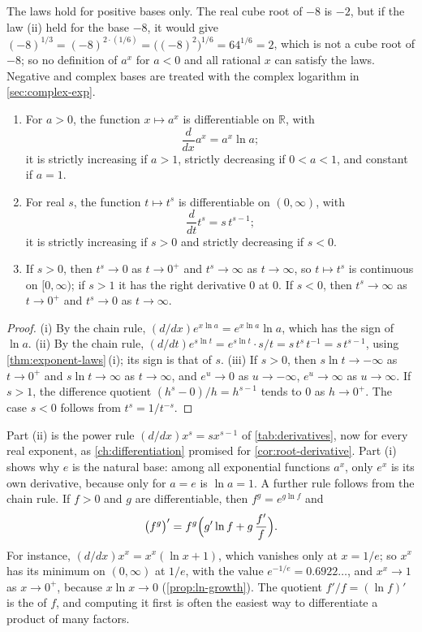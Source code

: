 The laws hold for positive bases only. The real cube root of $-8$ is $-2$, but if the law (ii) held for the base $-8$, it would give $(-8)^{1/3}=(-8)^{2\cdot(1/6)}=\bigl((-8)^2\bigr)^{1/6}=64^{1/6}=2$, which is not a cube root of $-8$; so no definition of $a^x$ for $a<0$ and all rational $x$ can satisfy the laws. Negative and complex bases are treated with the complex logarithm in \cref{sec:complex-exp}.

\begin{theorem}
\label{thm:power-derivatives}
\leavevmode
\begin{enumerate}
\item For $a>0$, the function $x\mapsto a^x$ is differentiable on $\mathbb R$, with
\[
\frac d{dx}a^x=a^x\ln a ;
\]
it is strictly increasing if $a>1$, strictly decreasing if $0<a<1$, and constant if $a=1$.
\item For real $s$, the function $t\mapsto t^s$ is differentiable on $(0,\infty)$, with
\[
\frac d{dt}t^s=s\,t^{s-1} ;
\]
it is strictly increasing if $s>0$ and strictly decreasing if $s<0$.
\item If $s>0$, then $t^s\to0$ as $t\to0^+$ and $t^s\to\infty$ as $t\to\infty$, so $t\mapsto t^s$ is continuous on $[0,\infty)$; if $s>1$ it has the right derivative $0$ at $0$. If $s<0$, then $t^s\to\infty$ as $t\to0^+$ and $t^s\to0$ as $t\to\infty$.
\end{enumerate}
\end{theorem}

\begin{proof}
(i) By the chain rule, $(d/dx)e^{x\ln a}=e^{x\ln a}\ln a$, which has the sign of $\ln a$. (ii) By the chain rule, $(d/dt)e^{s\ln t}=e^{s\ln t}\cdot s/t=s\,t^s\,t^{-1}=s\,t^{s-1}$, using \cref{thm:exponent-laws}\,(i); its sign is that of $s$. (iii) If $s>0$, then $s\ln t\to-\infty$ as $t\to0^+$ and $s\ln t\to\infty$ as $t\to\infty$, and $e^u\to0$ as $u\to-\infty$, $e^u\to\infty$ as $u\to\infty$. If $s>1$, the difference quotient $(h^s-0)/h=h^{s-1}$ tends to $0$ as $h\to0^+$. The case $s<0$ follows from $t^s=1/t^{-s}$.
\end{proof}

Part (ii) is the power rule $(d/dx)x^s=sx^{s-1}$ of \cref{tab:derivatives}, now for every real exponent, as \cref{ch:differentiation} promised for \cref{cor:root-derivative}. Part (i) shows why $e$ is the natural base: among all exponential functions $a^x$, only $e^x$ is its own derivative, because only for $a=e$ is $\ln a=1$. A further rule follows from the chain rule. If $f>0$ and $g$ are differentiable, then $f^g=e^{g\ln f}$ and
\[
\bigl(f^g\bigr)'=f^g\Bigl(g'\ln f+g\,\frac{f'}f\Bigr).
\]
For instance, $(d/dx)x^x=x^x(\ln x+1)$, which vanishes only at $x=1/e$; so $x^x$ has its minimum on $(0,\infty)$ at $1/e$, with the value $e^{-1/e}=0.6922\ldots$, and $x^x\to1$ as $x\to0^+$, because $x\ln x\to0$ (\cref{prop:ln-growth}). The quotient $f'/f=(\ln f)'$ is the  of $f$, and computing it first is often the easiest way to differentiate a product of many factors.

